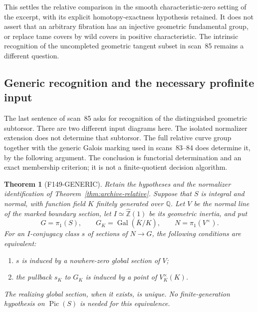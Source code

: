 \documentclass[11pt,a4paper]{article}
\newtheorem{theorem}{Theorem}[section]
\theoremstyle{definition}
\begin{document}
This settles the relative comparison in the smooth
characteristic-zero setting of the excerpt, with its explicit
homotopy-exactness hypothesis retained. It does not assert that an
arbitrary fibration has an injective geometric fundamental group,
or replace tame covers by wild covers in positive characteristic.
The intrinsic recognition of the uncompleted geometric tangent
subset in scan~85 remains a different question.

\subsection{Generic recognition and the necessary profinite input}
\label{sec:archive-recognition}

The last sentence of scan~85 asks for recognition of the distinguished
geometric subtorsor. There are two different input diagrams here.
The isolated normalizer extension does not determine that subtorsor.
The full relative curve group together with the generic Galois marking
used in scans~83--84 does determine it, by the following argument.
The conclusion is functorial determination and an exact membership
criterion; it is not a finite-quotient decision algorithm.

\begin{theorem}[F149-GENERIC]\label{thm:archive-generic}
Retain the hypotheses and the normalizer identification of
Theorem~\ref{thm:archive-relative}. Suppose that $S$ is integral and
normal, with function field $K$ finitely generated over $\mathbb Q$.
Let $V$ be the normal line of the marked boundary section, let
$I\simeq\widehat{\mathbb Z}(1)$ be its geometric inertia, and put
\[
 G=\pi_1(S),\qquad G_K=\operatorname{Gal}(\overline K/K),\qquad
 N=\pi_1(V^\times).
\]
For an $I$-conjugacy class $s$ of sections of $N\to G$, the following
conditions are equivalent:
\begin{enumerate}[label=\textup{(\roman*)}]
\item $s$ is induced by a nowhere-zero global section of $V$;
\item the pullback $s_K$ to $G_K$ is induced by a point of
      $V_K^\times(K)$.
\end{enumerate}
The realizing global section, when it exists, is unique.
No finite-generation hypothesis on $\operatorname{Pic}(S)$ is needed
for this equivalence.
\end{theorem}
\end{document}
